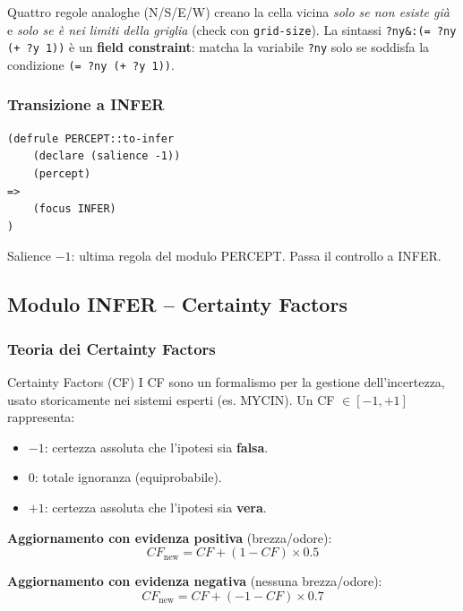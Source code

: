 \documentclass[12pt,a4paper]{article}
\begin{document}
Quattro regole analoghe (N/S/E/W) creano la cella vicina \emph{solo se non
esiste già} e \emph{solo se è nei limiti della griglia} (check con
\texttt{grid-size}). La sintassi \texttt{?ny\&:(= ?ny (+ ?y 1))} è un
\textbf{field constraint}: matcha la variabile \texttt{?ny} solo se soddisfa
la condizione \texttt{(= ?ny (+ ?y 1))}.

\subsubsection{Transizione a INFER}

\begin{lstlisting}
(defrule PERCEPT::to-infer
    (declare (salience -1))
    (percept)
=>
    (focus INFER)
)
\end{lstlisting}

Salience $-1$: ultima regola del modulo PERCEPT. Passa il controllo a INFER.

\subsection{Modulo INFER -- Certainty Factors}

\subsubsection{Teoria dei Certainty Factors}

\begin{mathbox}{Certainty Factors (CF)}
I CF sono un formalismo per la gestione dell'incertezza, usato storicamente
nei sistemi esperti (es. MYCIN). Un CF $\in [-1, +1]$ rappresenta:
\begin{itemize}[noitemsep]
  \item $-1$: certezza assoluta che l'ipotesi sia \textbf{falsa}.
  \item $0$: totale ignoranza (equiprobabile).
  \item $+1$: certezza assoluta che l'ipotesi sia \textbf{vera}.
\end{itemize}

\textbf{Aggiornamento con evidenza positiva} (brezza/odore):
\[
  CF_{\text{new}} = CF + (1 - CF) \times 0.5
\]

\textbf{Aggiornamento con evidenza negativa} (nessuna brezza/odore):
\[
  CF_{\text{new}} = CF + (-1 - CF) \times 0.7
\]
\end{mathbox}
\end{document}
